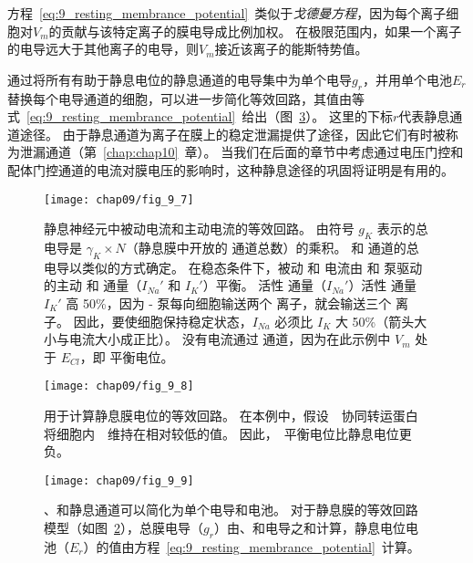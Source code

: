 \begin{proposition}[利用等效回路模型计算静息膜电位]
	\quad \quad 方程~\ref{eq:9_resting_membrance_potential}~类似于\textit{戈德曼方程}，因为每个离子细胞对$V_m$的贡献与该特定离子的膜电导成比例加权。
	在极限范围内，如果一个离子的电导远大于其他离子的电导，则$V_m$接近该离子的能斯特势值。
	
	\quad \quad 通过将所有有助于静息电位的静息通道的电导集中为单个电导$ g_r $，并用单个电池$ E_r $替换每个电导通道的细胞，可以进一步简化等效回路，其值由等式~\ref{eq:9_resting_membrance_potential}~给出（图~\ref{fig:9_9}）。
	这里的下标$ r $代表静息通道途径。
	由于静息通道为离子在膜上的稳定泄漏提供了途径，因此它们有时被称为泄漏通道（第~\ref{chap:chap10}~章）。
	当我们在后面的章节中考虑通过电压门控和配体门控通道的电流对膜电压的影响时，这种静息途径的巩固将证明是有用的。
	
\end{proposition}


\begin{figure}[htbp]
	\centering
	\texttt{[image: chap09/fig\_9\_7]}
	\caption{静息神经元中被动电流和主动电流的等效回路。
		由符号 $ g_K $ 表示的总  电导是 $ \gamma_K \times N $（静息膜中开放的  通道总数）的乘积。
		 和  通道的总电导以类似的方式确定。
		在稳态条件下，被动  和  电流由 和 泵驱动的主动  和  通量（$I_{Na}'$ 和 $I_K'$）平衡。
		活性  通量（$I_{Na}'$）活性  通量 $I_K'$ 高 50\%，因为 - 泵每向细胞输送两个  离子，就会输送三个  离子。
		因此，要使细胞保持稳定状态，$I_{Na}$ 必须比 $ I_K $ 大 50\%（箭头大小与电流大小成正比）。
		没有电流通过  通道，因为在此示例中 $ V_m $ 处于 $ E_{Cl} $，即  平衡电位。
	}
	\label{fig:9_7}
\end{figure}


\begin{figure}[htbp]
	\centering
	\texttt{[image: chap09/fig\_9\_8]}
	\caption{用于计算静息膜电位的等效回路。
		在本例中，假设~~协同转运蛋白将细胞内~~维持在相对较低的值。
		因此，~平衡电位比静息电位更负。}
	\label{fig:9_8}
\end{figure}


\begin{figure}[htbp]
	\centering
	\texttt{[image: chap09/fig\_9\_9]}
	\caption{、和静息通道可以简化为单个电导和电池。
		对于静息膜的等效回路模型（如图~\ref{fig:9_8}），总膜电导（$ g_r $）由、和电导之和计算，静息电位电池（$ E_r $）的值由方程~\ref{eq:9_resting_membrance_potential}~计算。}
	\label{fig:9_9}
\end{figure}


